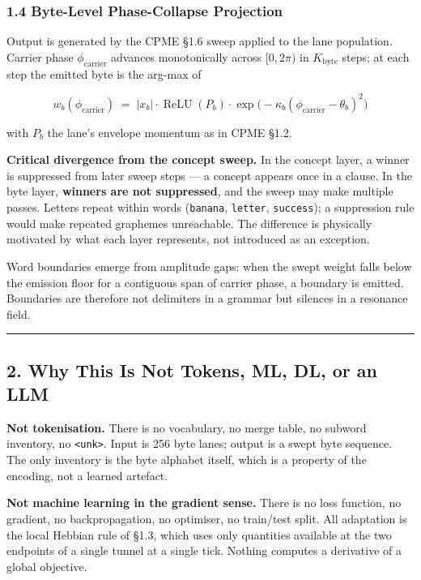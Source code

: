 \documentclass[
  11pt,
  a4paper,
]{article}
\begin{document}
\subsubsection{1.4 Byte-Level Phase-Collapse
Projection}\label{byte-level-phase-collapse-projection}

Output is generated by the CPME §1.6 sweep applied to the lane
population. Carrier phase \(\phi_{\text{carrier}}\) advances
monotonically across \([0, 2\pi)\) in \(K_{\text{byte}}\) steps; at each
step the emitted byte is the arg-max of

\[ w_b(\phi_{\text{carrier}}) \;=\; |x_b| \cdot \operatorname{ReLU}(P_b) \cdot \exp\!\bigl(-\kappa_b (\phi_{\text{carrier}} - \theta_b)^2\bigr) \]

with \(P_b\) the lane's envelope momentum as in CPME §1.2.

\textbf{Critical divergence from the concept sweep.} In the concept
layer, a winner is suppressed from later sweep steps --- a concept
appears once in a clause. In the byte layer, \textbf{winners are not
suppressed}, and the sweep may make multiple passes. Letters repeat
within words (\texttt{banana}, \texttt{letter}, \texttt{success}); a
suppression rule would make repeated graphemes unreachable. The
difference is physically motivated by what each layer represents, not
introduced as an exception.

Word boundaries emerge from amplitude gaps: when the swept weight falls
below the emission floor for a contiguous span of carrier phase, a
boundary is emitted. Boundaries are therefore not delimiters in a
grammar but silences in a resonance field.

\begin{center}\rule{0.5\linewidth}{0.5pt}\end{center}

\subsection{2. Why This Is Not Tokens, ML, DL, or an
LLM}\label{why-this-is-not-tokens-ml-dl-or-an-llm}

\textbf{Not tokenisation.} There is no vocabulary, no merge table, no
subword inventory, no \texttt{\textless{}unk\textgreater{}}. Input is
256 byte lanes; output is a swept byte sequence. The only inventory is
the byte alphabet itself, which is a property of the encoding, not a
learned artefact.

\textbf{Not machine learning in the gradient sense.} There is no loss
function, no gradient, no backpropagation, no optimiser, no train/test
split. All adaptation is the local Hebbian rule of §1.3, which uses only
quantities available at the two endpoints of a single tunnel at a single
tick. Nothing computes a derivative of a global objective.
\end{document}
